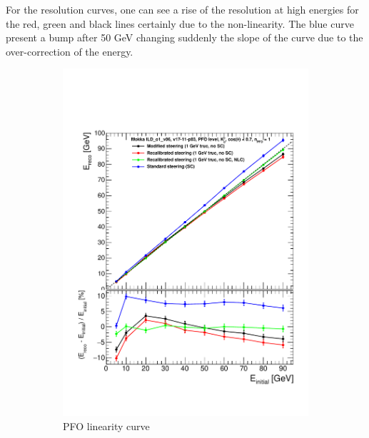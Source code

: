 For the resolution curves, one can see a rise of the resolution at high energies for the red, green and black lines certainly due to the non-linearity. The blue curve present a bump after 50 GeV changing suddenly the slope of the curve due to the over-correction of the energy.\\

\begin{figure}[htbp!]
  \centering
  \begin{subfigure}[t]{0.45\textwidth}
    \centering
    \includegraphics[width=1\linewidth]{../Thesis_Plots/ILD/NoSmearing/Plots_Comparison/Comparison_linearity_Curves_PFO}
    \caption{PFO linearity curve} \label{fig:linpfo}
  \end{subfigure}
  \hfill
  \begin{subfigure}[t]{0.45\textwidth}
    \centering

\end{subfigure}
\end{figure}
